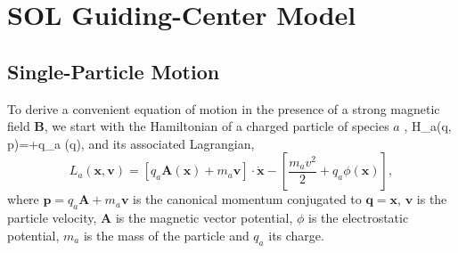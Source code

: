 \section{SOL Guiding-Center Model}
\label{sec:solparticle}

\subsection{Single-Particle Motion}

To derive a convenient equation of motion in the presence of a strong magnetic field $\mathbf B$, we start with the Hamiltonian of a charged particle of species $a$ \citep{Jackson1999},
%
\be
    H_a(\mathbf q, \mathbf p)=+q_a \phi(\mathbf q),
    \label{eq:hamiltonian}
\ee
%
and its associated Lagrangian,
%
\begin{equation}
    L_a(\mathbf x, \mathbf v)=\left[q_a \mathbf A(\mathbf x) + m_a \mathbf v\right]\cdot \dot{\mathbf x}-\left[\frac{m_a v^2}{2}+q_a \phi(\mathbf x)\right],
    \label{eq:lagrangian}
\end{equation}
%
where $\mathbf p = q_a \mathbf A + m _a\mathbf v$ is the canonical momentum conjugated to $\mathbf q = \mathbf x$, $\mathbf v$ is the particle velocity, $\mathbf A$ is the magnetic vector potential, $\phi$ is the electrostatic potential, $m_a$ is the mass of the particle and $q_a$ its charge.

